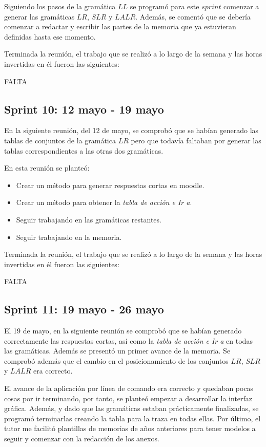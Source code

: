 Siguiendo los pasos de la gramática $LL$ se programó para este $sprint$ comenzar a generar las gramáticas $LR$, $SLR$ y $LALR$.
Además, se comentó que se debería comenzar a redactar y escribir las partes de la memoria que ya estuvieran definidas hasta ese momento.

Terminada la reunión, el trabajo que se realizó a lo largo de la semana y las horas invertidas en él fueron las siguientes:

FALTA

\subsection{Sprint 10: 12 mayo - 19 mayo}
En la siguiente reunión, del 12 de mayo, se comprobó que se habían generado las tablas de conjuntos de la gramática $LR$ pero que todavía faltaban por generar las tablas correspondientes a las otras dos gramáticas.

En esta reunión se planteó:
\begin{itemize}
\item Crear un método para generar respuestas cortas en moodle.
\item Crear un método para obtener la \textit{tabla de acción e Ir a}.
\item Seguir trabajando en las gramáticas restantes.
\item Seguir trabajando en la memoria.
\end{itemize}

Terminada la reunión, el trabajo que se realizó a lo largo de la semana y las horas invertidas en él fueron las siguientes:

FALTA
\subsection{Sprint 11: 19 mayo - 26 mayo}
El 19 de mayo, en la siguiente reunión se comprobó que se habían generado correctamente las respuestas cortas, así como la \textit{tabla de acción e Ir a} en todas las gramáticas. 
Además se presentó un primer avance de la memoria.
Se comprobó además que el cambio en el posicionamiento de los conjuntos $LR$, $SLR$ y $LALR$ era correcto.

El avance de la aplicación por línea de comando era correcto y quedaban pocas cosas por ir terminando, por tanto, se planteó empezar a desarrollar la interfaz gráfica.
Además, y dado que las gramáticas estaban prácticamente finalizadas, se programó terminarlas creando la tabla para la traza en todas ellas.
Por último, el tutor me facilitó plantillas de memorias de años anteriores para tener modelos a seguir y comenzar con la redacción de los anexos.

